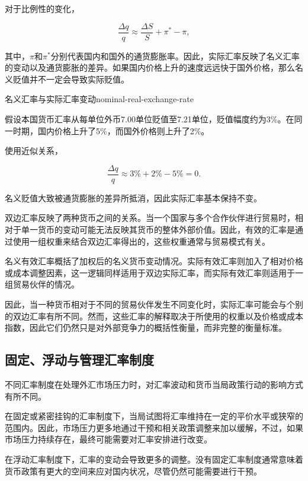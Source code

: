 对于比例性的变化，

\begin{equation}
\frac{\Delta q}{q}
\approx
\frac{\Delta S}{S}
+
\pi^{*}
-\pi,
\label{eq:ch10-real-exchange-rate-change}
\end{equation}

其中，$\pi$和$\pi^{*}$分别代表国内和国外的通货膨胀率。因此，实际汇率反映了名义汇率的变动以及通货膨胀的差异。如果国内价格上升的速度远远快于国外价格，那么名义贬值并不一定会导致实际贬值。

\begin{example}{名义汇率与实际汇率变动}{nominal-real-exchange-rate}

假设本国货币汇率从每单位外币7.00单位贬值至7.21单位，贬值幅度约为3\%。在同一时期，国内价格上升了5\%，而国外价格则上升了2\%。

使用近似关系，

$$
\frac{\Delta q}{q}
\approx
3\%+2\%-5\%=0.
$$

名义贬值大致被通货膨胀的差异所抵消，因此实际汇率基本保持不变。

\end{example}

双边汇率反映了两种货币之间的关系。当一个国家与多个合作伙伴进行贸易时，相对于单一货币的变动可能无法反映其货币的整体外部价值。因此，有效的汇率是通过使用一组权重来结合双边汇率得出的，这些权重通常与贸易模式有关。

名义有效汇率概括了加权后的名义货币变动情况。实际有效汇率则加入了相对价格或成本调整因素，这一逻辑同样适用于双边实际汇率，而实际有效汇率则适用于一组贸易伙伴的情况。

因此，当一种货币相对于不同的贸易伙伴发生不同变化时，实际汇率可能会与个别的双边汇率有所不同。然而，这些汇率的解释取决于所使用的权重以及价格或成本指数，因此它们仍然只是对外部竞争力的概括性衡量，而非完整的衡量标准。


\subsection{固定、浮动与管理汇率制度}

不同汇率制度在处理外汇市场压力时，对汇率波动和货币当局政策行动的影响方式有所不同。

在固定或紧密挂钩的汇率制度下，当局试图将汇率维持在一定的平价水平或狭窄的范围内。因此，市场压力更多地通过干预和相关政策调整来加以缓解，不过，如果市场压力持续存在，最终可能需要对汇率安排进行改变。

在浮动汇率制度下，汇率的变动会导致更多的调整。没有固定汇率制度通常意味着货币政策有更大的空间来应对国内状况，尽管仍然可能需要进行干预。

